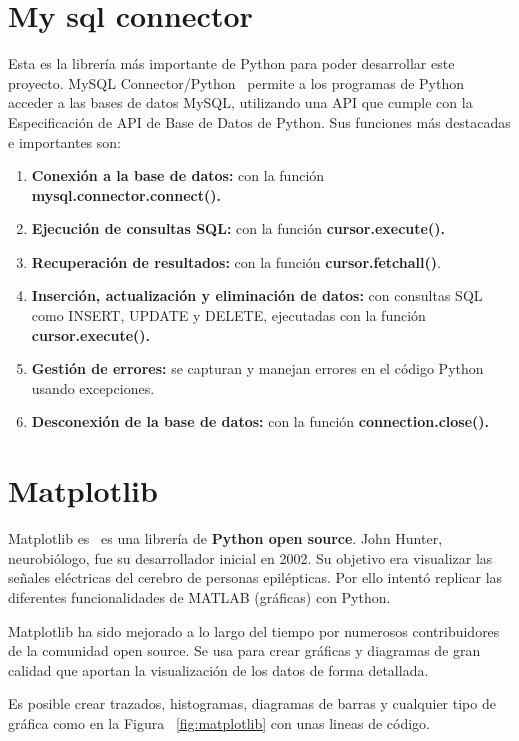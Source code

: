 \documentclass[a4paper, 12pt]{book}
\begin{document}
\section{My sql connector} 
\label{sec:mysqlconnector}
Esta es la librería más importante de Python para poder desarrollar este proyecto.
MySQL Connector/Python~\cite{mysql:_connectors} permite a los programas de Python acceder a las bases de datos MySQL, utilizando una API que cumple con la Especificación de API de Base de Datos de Python.
Sus funciones más destacadas e importantes son:
\begin{enumerate}
	\item \textbf{Conexión a la base de datos: }con la función \textbf{mysql.connector.connect().}
	\item \textbf{Ejecución de consultas SQL: }con la función \textbf{cursor.execute().}
	\item \textbf{Recuperación de resultados: }con la función \textbf{cursor.fetchall()}.
	\item \textbf{Inserción, actualización y eliminación de datos: }con consultas SQL como INSERT, UPDATE y DELETE, ejecutadas con la función \textbf{cursor.execute().}
	\item \textbf{Gestión de errores: }se capturan y manejan errores en el código Python usando excepciones.
	\item \textbf{Desconexión de la base de datos: }con la función \textbf{connection.close().}
\end{enumerate}

\section{Matplotlib} 
\label{sec:matplotlib}


Matplotlib es~\cite{python:_matplotlib} es una librería de \textbf{Python open source}. John Hunter, neurobiólogo, fue su desarrollador inicial en 2002. Su objetivo era visualizar las señales eléctricas del cerebro de personas epilépticas. Por ello intentó replicar las diferentes funcionalidades de MATLAB (gráficas) con Python. 

Matplotlib ha sido mejorado a lo largo del tiempo por numerosos contribuidores de la comunidad open source. Se usa para crear gráficas y diagramas de gran calidad que aportan la visualización de los datos de  forma detallada.

Es posible crear trazados, histogramas, diagramas de barras y cualquier tipo de gráfica como en la Figura ~\ref{fig:matplotlib} con unas lineas de código.
\end{document}
